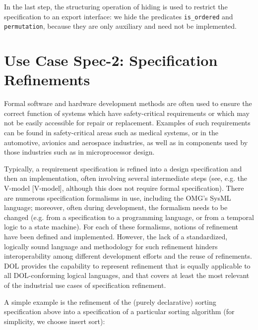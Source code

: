 \documentclass[10pt,fleqn,%
\ifpretendfinal
final%
\else
draft%
\fi,
]{scrreprt}
\begin{document}
In the last step, the structuring operation of hiding is used to
restrict the specification to an export interface: we hide the
predicates \texttt{is\_ordered} and \texttt{permutation}, because they
are only auxiliary and need not be implemented.


\section{Use Case Spec-2: Specification Refinements}\label{spec-2}
Formal software and hardware development methods are often used to
ensure the correct function of systems which have safety-critical
requirements or which may not be easily accessible for repair or
replacement.  Examples of such requirements can be found in
safety-critical areas such as medical systems, or in the automotive,
avionics and aerospace industries, as well as in components used by
those industries such as in microprocessor design.

Typically, a requirement specification is refined into a
design specification and then an implementation, often involving
several intermediate steps (see, e.g. the V-model [V-model], although
this does not require formal specification).  There are numerous
specification formalisms in use, including the OMG's SysML language;
moreover, often during development, the formalism needs to be changed
(e.g. from a specification to a programming language, or from a
temporal logic to a state machine). For each of these formalisms,
notions of refinement have been defined and implemented. However, the
lack of a standardized, logically sound language and methodology for
such refinement hinders interoperability among different development
efforts and the reuse of refinements.  DOL provides the capability to
represent refinement that is equally applicable to all DOL-conforming
logical languages, and that covers at least the most relevant of the
industrial use cases of specification refinement.

A simple example is the refinement of the (purely declarative) sorting
specification above into a specification of a particular sorting
algorithm (for simplicity, we choose insert sort):
\end{document}
